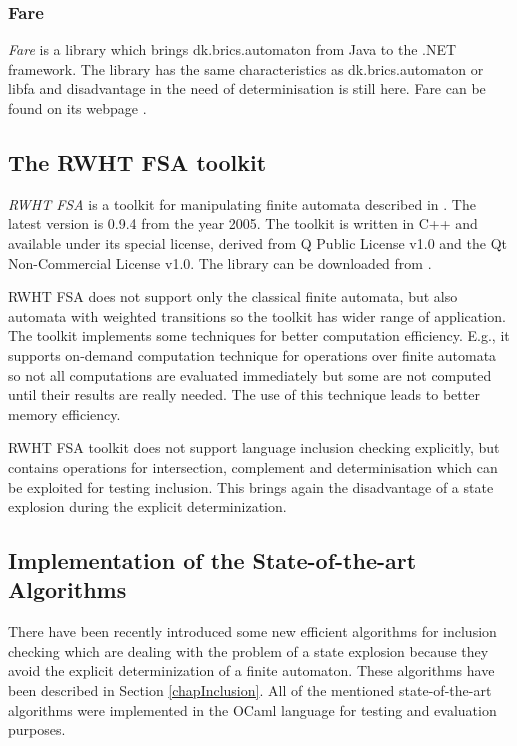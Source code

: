 \subsubsection{Fare}
\emph{Fare} is a library which brings dk.brics.automaton from Java to the .NET framework. 
The library has the same characteristics as dk.brics.automaton or libfa and disadvantage in the need of determinisation is still here. 
Fare can be found on its webpage \cite{fare}.

\subsection{The RWHT FSA toolkit}
\emph{RWHT FSA} is a toolkit for manipulating finite automata described in \cite{kanthakN04}. 
The latest version is 0.9.4 from the year 2005. The toolkit is written in C++
and available under its special license, derived from Q Public License v1.0 and the Qt Non-Commercial License v1.0. The library can be downloaded from \cite{rwth}. 

RWHT FSA does not support only the classical finite automata, but also automata with weighted transitions so the toolkit has wider range of application.
The toolkit implements some techniques for better computation efficiency. E.g., it supports on-demand computation technique for operations over finite automata 
so not all computations are evaluated immediately but some are not computed until their results are really
needed. The use of this technique leads to better memory efficiency. 

RWHT FSA toolkit does not support language inclusion checking explicitly, but contains operations for intersection, complement and
determinisation which can be exploited for testing inclusion. This brings again the disadvantage of a state explosion during 
the explicit determinization. 

\subsection{Implementation of the State-of-the-art Algorithms}
There have been recently introduced some new efficient algorithms for inclusion checking 
which are dealing with the problem of a state explosion because they avoid the explicit determinization of a finite automaton. These 
algorithms have been described in Section \ref{chapInclusion}.
All of the mentioned state-of-the-art algorithms were implemented in the OCaml language for testing and evaluation purposes.

